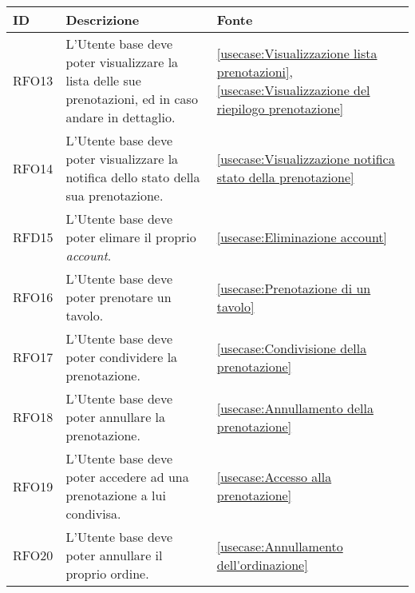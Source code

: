\begin{table}[H]
	\renewcommand{\arraystretch}{1.5}
	\centering
	\begin{tabularx}{\textwidth}{l|X|p{2cm}}
		\textbf{ID} & \textbf{Descrizione}                                                                                           & \textbf{Fonte}                                                                                                     \\
		\hline
		RFO13       & L'Utente base deve poter visualizzare la lista delle sue prenotazioni, ed in caso andare in dettaglio.         & \autoref{usecase:Visualizzazione lista prenotazioni}, \autoref{usecase:Visualizzazione del riepilogo prenotazione} \\
		\hline
		RFO14       & L'Utente base deve poter visualizzare la notifica dello stato della sua prenotazione.                          & \autoref{usecase:Visualizzazione notifica stato della prenotazione}                                                \\
		\hline
		RFD15       & L'Utente base deve poter elimare il proprio \textit{account}.                                                  & \autoref{usecase:Eliminazione account}                                                                             \\
		\hline
		RFO16       & L'Utente base deve poter prenotare un tavolo.                                                                  & \autoref{usecase:Prenotazione di un tavolo}                                                                        \\
		\hline
		RFO17       & L'Utente base deve poter condividere la prenotazione.                                                          & \autoref{usecase:Condivisione della prenotazione}                                                                  \\
		\hline
		RFO18       & L'Utente base deve poter annullare la prenotazione.                                                            & \autoref{usecase:Annullamento della prenotazione}                                                                  \\
		\hline
		RFO19       & L'Utente base deve poter accedere ad una prenotazione a lui condivisa.										 & \autoref{usecase:Accesso alla prenotazione}                                                                        \\
		\hline
		RFO20       & L'Utente base deve poter annullare il proprio ordine.                                                          & \autoref{usecase:Annullamento dell'ordinazione}                                                                    \\

\end{tabularx}
\end{table}
